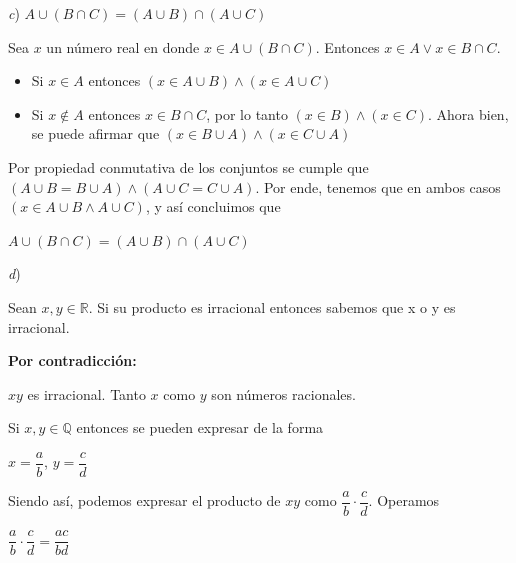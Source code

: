 \documentclass[11pt,a4paper]{article}
\begin{document}
\begin{enumerate}
\vspace{0.5cm}

\textit{c}) $ A \cup (B \cap C) = (A \cup B) \cap (A \cup C) $

\vspace{0.3cm}

Sea $x$ un número real en donde $x \in A \cup (B \cap C)$. Entonces $x \in A  \vee  x \in B \cap C.$ 

\begin{itemize}
\item Si $x \in A$ entonces $(x \in A \cup B) \wedge (x \in A \cup C)$
\end{itemize}

\begin{itemize}
\item Si $x \notin A$ entonces $x \in B \cap C$, por lo tanto $(x \in B) \wedge (x \in C)$. Ahora bien, se puede afirmar que $(x \in B \cup A) \wedge (x \in C \cup A)$
\end{itemize}

Por propiedad conmutativa de los conjuntos se cumple que $(A \cup B = B \cup A) \wedge (A \cup C = C \cup A)$. Por ende, tenemos que en ambos casos $(x \in A \cup B \wedge A \cup C)$, y así concluimos que

\begin{center}
    $A \cup (B \cap C) = (A \cup B) \cap (A \cup C)$
\end{center}

\textit{d}) 

Sean $x, y \in \mathbb{R}$. Si su producto es irracional entonces sabemos que x o y es irracional.

\textbf{Por contradicción:} 

$xy$ es irracional. Tanto $x$ como $y$ son números racionales. 

Si $x, y \in \mathbb{Q}$ entonces se pueden expresar de la forma

\begin{center}
    $x = \dfrac{a}{b}$, $y = \dfrac{c}{d}
    $
\end{center}

Siendo así, podemos expresar el producto de $xy$ como $\dfrac{a}{b} \cdot \dfrac{c}{d}$. Operamos

\begin{center}

$\dfrac{a}{b} \cdot \dfrac{c}{d} = \dfrac{ac}{bd}$

\end{center}


\end{enumerate}
\end{document}
